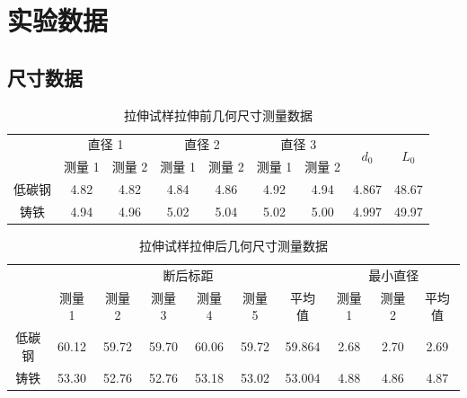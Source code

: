 \documentclass[a4paper,utf8]{article}
\begin{document}
\section{实验数据}
\subsection{尺寸数据}
\begin{table}[!ht]
    \caption{拉伸试样拉伸前几何尺寸测量数据}
    \begin{tabular}{*{9}{c}}\toprule
        & \multicolumn{2}{c}{直径 1} & \multicolumn{2}{c}{直径 2} & \multicolumn{2}{c}{直径 3} & \multirow[c]{2}{*}{$d_0$} & \multirow[c]{2}{*}{$L_0$} \\
        & 测量 1 & 测量 2 & 测量 1 & 测量 2 & 测量 1 & 测量 2 & & \\ \midrule
        低碳钢 & 4.82 & 4.82 & 4.84 & 4.86 & 4.92 & 4.94 & 4.867 & 48.67 \\ 
        铸铁 & 4.94 & 4.96 & 5.02 & 5.04 & 5.02 & 5.00 & 4.997 & 49.97 \\ \bottomrule
    \end{tabular}
\end{table}

\begin{table}[!ht]
    \caption{拉伸试样拉伸后几何尺寸测量数据}
    \begin{tabular}{*{10}{c}}\toprule
        & \multicolumn{6}{c}{断后标距} & \multicolumn{3}{c}{最小直径} \\
        & 测量 1 & 测量 2 & 测量 3 & 测量 4 & 测量 5 & 平均值 & 测量 1 & 测量 2 & 平均值 \\ \midrule
        低碳钢 & 60.12 & 59.72 & 59.70 & 60.06 & 59.72 & 59.864 & 2.68 & 2.70 & 2.69  \\ 
        铸铁 & 53.30 & 52.76 & 52.76 & 53.18 & 53.02 & 53.004 & 4.88 & 4.86 & 4.87  \\ \bottomrule
    \end{tabular}
\end{table}
\end{document}
